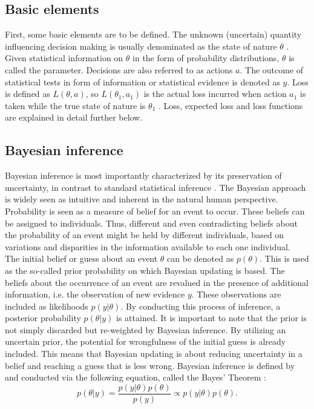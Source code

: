 	    \subsection{Basic elements}
	    First, some basic elements are to be defined. The unknown (uncertain) quantity influencing decision making is usually denominated as the state of nature $\theta$ \citep{berger2013stat}. Given statistical information on $\theta$ in the form of probability distributions, $\theta$ is called the parameter. 
	    Decisions are also referred to as actions $a$.
	    The outcome of statistical tests in form of information or statistical evidence is denoted as $y$.	    
	    Loss is defined as $L(\theta,a)$, so $L(\theta_1,a_1)$ is the actual loss incurred when action $a_1$ is taken while the true state of nature is $\theta_1$ \citep{berger2013stat}. Loss, expected loss and loss functions are explained in detail further below.  
        
        \subsection{Bayesian inference}
        Bayesian inference is most importantly characterized by its preservation of uncertainty, in contrast to standard statistical inference \citep{jaynes2003probability, box2011bayesian, harney2013bayesian, davidson2015}. The Bayesian approach is widely seen as intuitive and inherent in the natural human perspective. Probability is seen as a measure of belief for an event to occur. These beliefs can be assigned to individuals. Thus, different and even contradicting beliefs about the probability of an event might be held by different individuals, based on variations and disparities in the information available to each one individual.\\
        The initial belief or guess about an event $\theta$ can be denoted as $p(\theta)$. This is used as the so-called prior probability on which Bayesian updating is based. The beliefs about the occurrence of an event are revalued in the presence of additional information, i.e. the observation of new evidence $y$. These observations are included as likelihoods $p(y|\theta)$. By conducting this process of inference, a posterior probability $p(\theta|y)$ is attained. It is important to note that the prior is not simply discarded but re-weighted by Bayesian inference. By utilizing an uncertain prior, the potential for wrongfulness of the initial guess is already included. This means that Bayesian updating is about reducing uncertainty in a belief and reaching a guess that is less wrong. Bayesian inference is defined by and conducted via the following equation, called the Bayes' Theorem \citep{jaynes2003probability, box2011bayesian, harney2013bayesian, davidson2015}:
        \begin{equation}\label{eq:BayesTheorem}
        p(\theta|y) = \frac{p(y|\theta)p(\theta)}{p(y)}
        \propto p(y|\theta)p(\theta).
        \end{equation}
                
